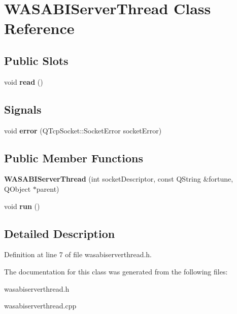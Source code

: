 \hypertarget{class_w_a_s_a_b_i_server_thread}{
\section{\-W\-A\-S\-A\-B\-I\-Server\-Thread \-Class \-Reference}
\label{class_w_a_s_a_b_i_server_thread}
}
\subsection*{\-Public \-Slots}
\begin{DoxyCompactItemize}
\item 
\hypertarget{class_w_a_s_a_b_i_server_thread_a3a1ab19faea6d612e7bfcc404c6c50b3}{
void {\bfseries read} ()}
\label{class_w_a_s_a_b_i_server_thread_a3a1ab19faea6d612e7bfcc404c6c50b3}

\end{DoxyCompactItemize}
\subsection*{\-Signals}
\begin{DoxyCompactItemize}
\item 
\hypertarget{class_w_a_s_a_b_i_server_thread_a6e2c42fc13466575cbf24be9d5993716}{
void {\bfseries error} (\-Q\-Tcp\-Socket\-::\-Socket\-Error socket\-Error)}
\label{class_w_a_s_a_b_i_server_thread_a6e2c42fc13466575cbf24be9d5993716}

\end{DoxyCompactItemize}
\subsection*{\-Public \-Member \-Functions}
\begin{DoxyCompactItemize}
\item 
\hypertarget{class_w_a_s_a_b_i_server_thread_ad1db9999206a54d87f7c60ecded7b924}{
{\bfseries \-W\-A\-S\-A\-B\-I\-Server\-Thread} (int socket\-Descriptor, const \-Q\-String \&fortune, \-Q\-Object $\ast$parent)}
\label{class_w_a_s_a_b_i_server_thread_ad1db9999206a54d87f7c60ecded7b924}

\item 
\hypertarget{class_w_a_s_a_b_i_server_thread_ad0b8320b971c0bc163d6d5764db0822c}{
void {\bfseries run} ()}
\label{class_w_a_s_a_b_i_server_thread_ad0b8320b971c0bc163d6d5764db0822c}

\end{DoxyCompactItemize}


\subsection{\-Detailed \-Description}


\-Definition at line 7 of file wasabiserverthread.\-h.



\-The documentation for this class was generated from the following files\-:\begin{DoxyCompactItemize}
\item 
wasabiserverthread.\-h\item 
wasabiserverthread.\-cpp\end{DoxyCompactItemize}
